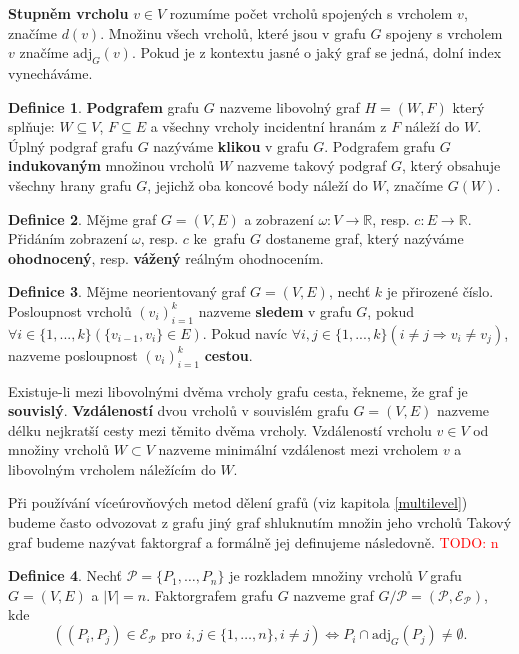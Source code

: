 \documentclass[11pt,american,czech,oneside]{book}
\theoremstyle{plain}
\theoremstyle{definition}
\newtheorem{definition}{Definice}
\newcommand{\TODO}[1]{\textcolor{red}{TODO: #1}\PackageWarning{TODO:}{TODO: #1!}}
\begin{document}
\textbf{Stupněm vrcholu} $v \in V$ rozumíme počet vrcholů spojených s vrcholem $v$, značíme $d(v)$. Množinu všech vrcholů, které jsou v grafu $G$ spojeny s vrcholem $v$ značíme $\mathrm{adj}_G(v)$. Pokud je z kontextu jasné o jaký graf se jedná, dolní index vynecháváme.

\begin{definition}
  \textbf{Podgrafem} grafu $G$ nazveme libovolný graf $H=(W,F)$ který splňuje: $W\subseteq V$, $F\subseteq E$ a všechny vrcholy incidentní hranám z $F$ náleží do $W$. Úplný podgraf grafu $G$ nazýváme \textbf{klikou} v grafu $G$. Podgrafem grafu $G$ \textbf{indukovaným} množinou vrcholů $W$ nazveme takový podgraf $G$, který obsahuje všechny hrany grafu $G$, jejichž oba koncové body náleží do $W$, značíme $G(W)$.
\end{definition}

\begin{definition}
  Mějme graf $G=(V,E)$ a zobrazení $\omega:V \rightarrow \mathbb{R}$, resp. $c: E \rightarrow \mathbb{R}$. Přidáním zobrazení $\omega$, resp. $c$ ke~grafu $G$ dostaneme graf, který nazýváme \textbf{ohodnocený}, resp. \textbf{vážený} reálným ohodnocením.
\end{definition}

\begin{definition}
  Mějme neorientovaný graf $G=(V,E)$, nechť $k$ je přirozené číslo. Posloupnost vrcholů $(v_i)_{i=1}^{k}$ nazveme \textbf{sledem} v grafu $G$, pokud $\forall i \in \{1,...,k\} (\{v_{i-1},v_i\} \in E)$. Pokud navíc  $\forall i,j \in \{1,...,k\} (i \neq j \Rightarrow v_i \neq v_j)$, nazveme posloupnost $(v_i)_{i=1}^{k}$ \textbf{cestou}.
\end{definition}

Existuje-li mezi libovolnými dvěma vrcholy grafu cesta, řekneme, že graf je \textbf{souvislý}.
\textbf{Vzdáleností} dvou vrcholů v souvislém grafu $G=(V,E)$ nazveme délku nejkratší cesty mezi těmito dvěma vrcholy. Vzdáleností vrcholu $v \in V$ od množiny vrcholů $W \subset V$ nazveme minimální vzdálenost mezi vrcholem $v$ a libovolným vrcholem náležícím do $W$. 

\medskip

Při používání víceúrovňových metod dělení grafů (viz kapitola \ref{multilevel}) budeme často odvozovat z grafu jiný graf shluknutím množin jeho vrcholů Takový graf budeme nazývat faktorgraf a formálně jej definujeme následovně.
\TODO{n}
\begin{definition}
  Nechť $\mathcal{P} = \{P_1,\ldots,P_n\}$ je rozkladem množiny vrcholů $V$ grafu $G = (V, E)$ a $|V|=n$. Faktorgrafem grafu $G$ nazveme graf $G / \mathcal{P} = (\mathcal{P}, \mathcal{E_P})$, kde 
  \[
    \left(
      (P_i, P_j)\in \mathcal{E_P} \mbox{ pro } i,j \in \{1,\ldots,n\}, i \neq j 
    \right)
    \Leftrightarrow {P_i \cap \mathrm{adj}_G(P_j) \neq \emptyset}
    .
  \]
\end{definition}
\end{document}
